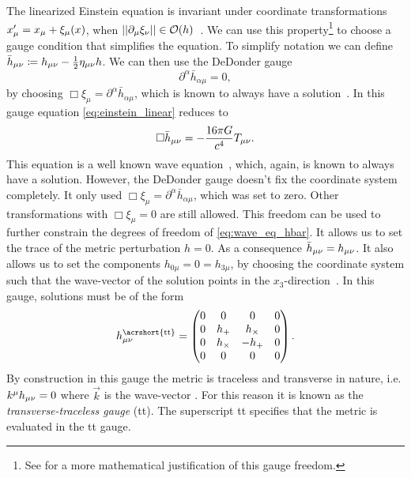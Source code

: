 The linearized Einstein equation is invariant under coordinate transformations $x_\mu'=x_\mu + \xi_\mu{\left( x \right)}$, when $\left|\left|\partial_\mu\xi_\nu\right|\right|\in\mathcal{O}{\left( h \right)}$~\cite{Maggiore:2008aaa}. We can use this property\footnote{See \cite{Wald:1984aaa} for a more mathematical justification of this gauge freedom.%
} to choose a gauge condition that simplifies the equation. To simplify notation we can define $\bar{h}_{\mu\nu}\coloneqq h_{\mu\nu}-\frac{1}{2} \eta_{\mu\nu} h$. We can then use the DeDonder gauge~\cite{Maggiore:2008aaa}
\begin{equation}
\partial^\alpha\bar{h}_{\alpha\mu} = 0,
\end{equation}
by choosing $\Box\xi_\mu = \partial^\alpha\bar{h}_{\alpha\mu}$, which is known to always have a solution~\cite{Maggiore:2008aaa}. %
In this gauge equation \eqref{eq:einstein_linear} reduces to
\begin{equation}\label{eq:wave_eq_hbar}
\Box\bar{h}_{\mu\nu} = -\frac{16\pi G}{c^4}T_{\mu\nu}.
\end{equation}
This equation is a well known wave equation~\cite{Dragon:2016aaa}, which, again, is known to always have a solution. However, the DeDonder gauge doesn't fix the coordinate system completely. It only used $\Box\xi_\mu = \partial^\alpha\bar{h}_{\alpha\mu}$, which was set to zero. Other transformations with $\Box\xi_\mu=0$ are still allowed. This freedom can be used to further constrain the degrees of freedom of \eqref{eq:wave_eq_hbar}. It allows us to set the trace of the metric perturbation $h=0$. As a consequence $\bar{h}_{\mu\nu} = h_{\mu\nu}$. It also allows us to set the components $h_{0\mu} = 0 = h_{3\mu}$, by choosing the coordinate system such that the wave-vector of the solution points in the $x_3$-direction~\cite{Misner:1973aaa}. %
In this gauge, solutions must be of the form
\begin{equation}
h^{\text{\acrshort{tt}}}_\mn=
\begin{pmatrix}
	0 & 0         & 0        & 0\\
	0 & h_+       & h_\times & 0\\
	0 & h_\times & -h_+      & 0\\
	0 & 0         & 0        & 0\\
\end{pmatrix}.
\end{equation}
By construction in this gauge the metric is traceless and transverse in nature, i.e. $k^\mu h_{\mu\nu}=0$ where $\vec{k}$ is the wave-vector \cite{Misner:1973aaa}. %
For this reason it is known as the \emph{transverse-traceless gauge} (\acrshort{tt}). The superscript \acrshort{tt} specifies that the metric is evaluated in the \acrshort{tt} gauge.


